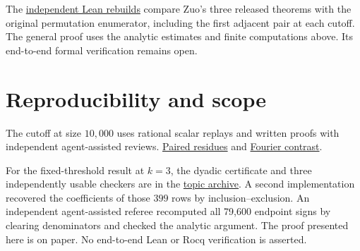 \documentclass[11pt]{article}
\begin{document}
The \href{https://github.com/ProgramComputer/open-math-research/pull/216}{independent Lean rebuilds}
compare Zuo's three released theorems with the original permutation
enumerator, including the first adjacent pair at each cutoff.
The general proof uses the analytic estimates and finite computations
above. Its end-to-end formal verification remains open.

\section*{Reproducibility and scope}
The cutoff at size $10{,}000$ uses rational scalar replays and written proofs with independent agent-assisted reviews. \href{https://github.com/ProgramComputer/open-math-research/tree/main/topics/long-cycle-excedances/paired-residues}{Paired residues} and \href{https://github.com/ProgramComputer/open-math-research/tree/main/topics/long-cycle-excedances/fourier-circle}{Fourier contrast}.

For the fixed-threshold result at $k=3$, the dyadic certificate and three independently usable checkers are in the
\href{https://github.com/ProgramComputer/open-math-research/tree/research/topics/long-cycle-excedances}{topic archive}.
A second implementation recovered the coefficients of those $399$ rows by inclusion--exclusion. An independent agent-assisted referee
recomputed all 79,600 endpoint signs by clearing denominators and checked the analytic argument.
The proof presented here is on paper. No end-to-end Lean or Rocq verification is asserted.
\end{document}
